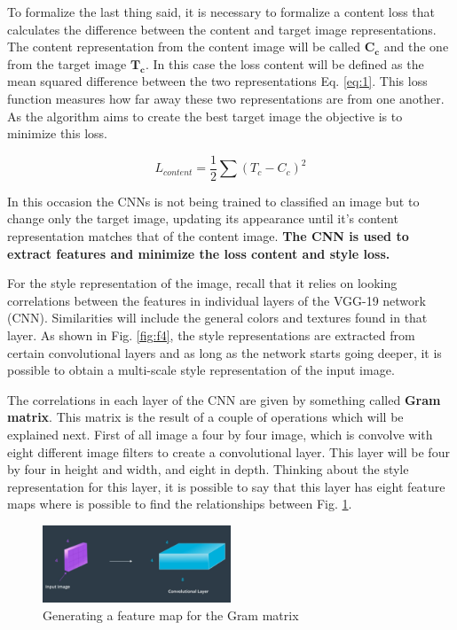 \documentclass{article}
\begin{document}
To formalize the last thing said, it is necessary to formalize a content loss that calculates the difference between the content and target image representations. The content representation from the content image will be called \(\boldsymbol{C_c}\) and the one from the target image \(\boldsymbol{T_c}\). In this case the loss content will be defined as the mean squared difference between the two representations Eq. \eqref{eq:1}. This loss function measures how far away these two representations are from one another. As the algorithm aims to create the best target image the objective is to minimize this loss.

\begin{equation}
L_{content} = \frac{1}{2} \sum(T_c - C_c)^2
\label{eq:1}
\end{equation}

In this occasion the CNNs is not being trained to classified an image but to change only the target image, updating its appearance until it's content representation matches that of the content image. \textbf{The CNN is used to extract features and minimize the loss content and style loss.}

For the style representation of the image, recall that it relies on looking correlations between the features in individual layers of the VGG-19 network (CNN). Similarities will include the general colors and textures found in that layer. As shown in Fig. \ref{fig:f4}, the style representations are extracted from certain convolutional layers and as long as the network starts going deeper, it is possible to obtain a multi-scale style representation of the input image.

The correlations in each layer of the CNN are given by something called \textbf{Gram matrix}. This matrix is the result of a couple of operations which will be explained next. First of all image a four by four image, which is convolve with eight different image filters to create a convolutional layer. This layer will be four by four in height and width, and eight in depth. Thinking about the style representation for this layer, it is possible to say that this layer has eight feature maps where is possible to find the relationships between Fig. \ref{fig:f6}.

\begin{figure}[ht]
    \centering
    \includegraphics[width=0.5\textwidth,height=0.5\textheight,keepaspectratio]{images/conv_layer.png}
    \captionsetup{justification=centering}
    \caption{Generating a feature map for the Gram matrix}
    \label{fig:f6}
\end{figure}
\end{document}
